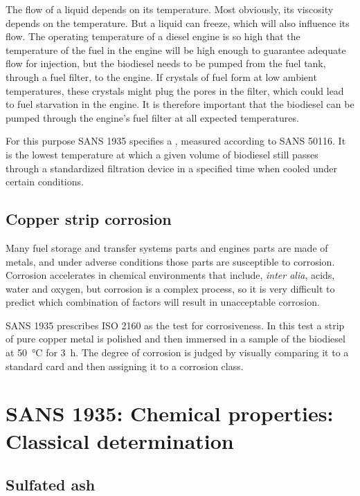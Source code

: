 The flow of a liquid depends on its temperature. Most obviously, its viscosity
depends on the temperature. But a liquid can freeze, which will also influence
its flow. The operating temperature of a diesel engine is so high that the
temperature of the fuel in the engine will be high enough to guarantee adequate
flow for injection, but the biodiesel needs to be pumped from the fuel tank,
through a fuel filter, to the engine. If crystals of fuel form at low ambient
temperatures, these crystals might plug the pores in the filter, which could
lead to fuel starvation in the engine. It is therefore important that the
biodiesel can be pumped through the engine's fuel filter at all expected
temperatures.

For this purpose SANS 1935 specifies a ,
measured according to SANS 50116. It is the lowest temperature at which a given
volume of biodiesel still passes through a standardized filtration device in a
specified time when cooled under certain conditions. 

\subsection{Copper strip corrosion}

Many fuel storage  and transfer systems parts and engines parts are made of
metals, and under adverse conditions those parts are susceptible to corrosion.
Corrosion accelerates in chemical environments that include, \textit{inter
alia}, acids, water and oxygen, but corrosion is a complex process, so it is
very difficult to predict which combination of factors will result in
unacceptable corrosion.

SANS 1935 prescribes ISO 2160 as the test for corrosiveness. In this test a
strip of pure copper metal is polished and then immersed in a sample of the
biodiesel at \SI{50}{\celsius} for \SI{3}{\hour}. The degree of corrosion is
judged by visually comparing it to a standard card and then assigning it to a
corrosion class.

\section{SANS 1935: Chemical properties: Classical determination}

\subsection{Sulfated ash}

